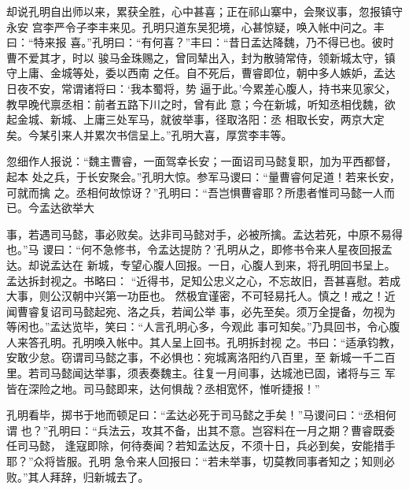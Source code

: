 却说孔明自出师以来，累获全胜，心中甚喜；正在祁山寨中，会聚议事，忽报镇守永安
宫李严令子李丰来见。孔明只道东吴犯境，心甚惊疑，唤入帐中问之。丰曰：“特来报
喜。”孔明曰：“有何喜？”丰曰：“昔日孟达降魏，乃不得已也。彼时曹不爱其才，时以
骏马金珠赐之，曾同辇出入，封为散骑常侍，领新城太守，镇守上庸、金城等处，委以西南
之任。自不死后，曹睿即位，朝中多人嫉妒，孟达日夜不安，常谓诸将曰：‘我本蜀将，势
逼于此。’今累差心腹人，持书来见家父，教早晚代禀丞相：前者五路下川之时，曾有此
意；今在新城，听知丞相伐魏，欲起金城、新城、上庸三处军马，就彼举事，径取洛阳：丞
相取长安，两京大定矣。今某引来人并累次书信呈上。”孔明大喜，厚赏李丰等。

忽细作人报说：“魏主曹睿，一面驾幸长安；一面诏司马懿复职，加为平西都督，起本
处之兵，于长安聚会。”孔明大惊。参军马谡曰：“量曹睿何足道！若来长安，可就而擒
之。丞相何故惊讶？”孔明曰：“吾岂惧曹睿耶？所患者惟司马懿一人而已。今孟达欲举大

事，若遇司马懿，事必败矣。达非司马懿对手，必被所擒。孟达若死，中原不易得也。”马
谡曰：“何不急修书，令孟达提防？’孔明从之，即修书令来人星夜回报孟达。却说孟达在
新城，专望心腹人回报。一日，心腹人到来，将孔明回书呈上。孟达拆封视之。书略曰：
“近得书，足知公忠义之心，不忘故旧，吾甚喜慰。若成大事，则公汉朝中兴第一功臣也。
然极宜谨密，不可轻易托人。慎之！戒之！近闻曹睿复诏司马懿起宛、洛之兵，若闻公举
事，必先至矣。须万全提备，勿视为等闲也。”孟达览毕，笑曰：“人言孔明心多，今观此
事可知矣。”乃具回书，令心腹人来答孔明。孔明唤入帐中。其人呈上回书。孔明拆封视
之。书曰：“适承钧教，安敢少怠。窃谓司马懿之事，不必惧也：宛城离洛阳约八百里，至
新城一千二百里。若司马懿闻达举事，须表奏魏主。往复一月间事，达城池已固，诸将与三
军皆在深险之地。司马懿即来，达何惧哉？丞相宽怀，惟听捷报！”

孔明看毕，掷书于地而顿足曰：“孟达必死于司马懿之手矣！”马谡问曰：“丞相何谓
也？”孔明曰：“兵法云，攻其不备，出其不意。岂容料在一月之期？曹睿既委任司马懿，
逢寇即除，何待奏闻？若知孟达反，不须十日，兵必到矣，安能措手耶？”众将皆服。孔明
急令来人回报曰：“若未举事，切莫教同事者知之；知则必败。”其人拜辞，归新城去了。

